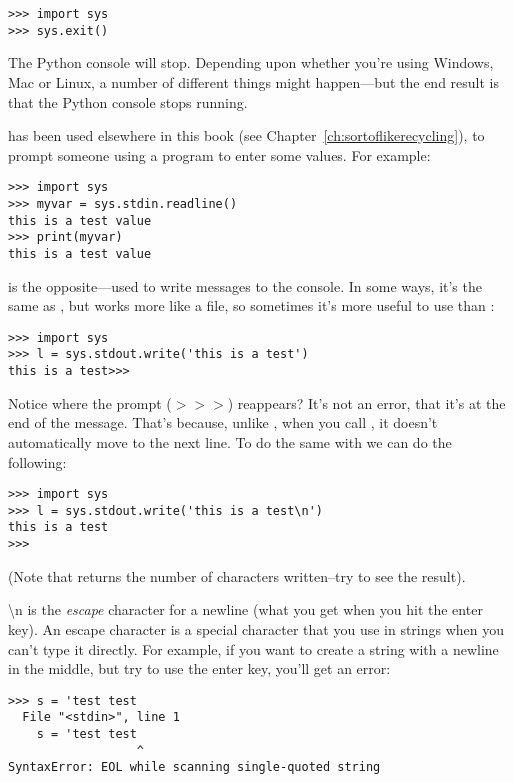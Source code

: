\begin{Verbatim}[frame=single]
>>> import sys
>>> sys.exit()
\end{Verbatim}

The Python console will stop. Depending upon whether you're using Windows, Mac or Linux, a number of different things might happen---but the end result is that the Python console stops running.

 has been used elsewhere in this book (see Chapter~\ref{ch:sortoflikerecycling}), to prompt someone using a program to enter some values. For example:

\begin{Verbatim}[frame=single]
>>> import sys
>>> myvar = sys.stdin.readline()
this is a test value
>>> print(myvar)
this is a test value
\end{Verbatim}

 is the opposite---used to write messages to the console. In some ways, it's the same as , but works more like a file, so sometimes it's more useful to use  than :

\begin{Verbatim}[frame=single]
>>> import sys
>>> l = sys.stdout.write('this is a test')
this is a test>>>
\end{Verbatim}

Notice where the prompt ($>>>$) reappears?  It's not an error, that it's at the end of the message.  That's because, unlike , when you call , it doesn't automatically move to the next line. To do the same with  we can do the following:

\begin{Verbatim}[frame=single]
>>> import sys
>>> l = sys.stdout.write('this is a test\n')
this is a test
>>>
\end{Verbatim}

\noindent
(Note that  returns the number of characters written--try  to see the result).

\noindent
{\textbackslash}n is the \emph{escape} character for a newline (what you get when you hit the enter key).  An escape character is a special character that you use in strings when you can't type it directly. For example, if you want to create a string with a newline in the middle, but try to use the enter key, you'll get an error:

\begin{Verbatim}[frame=single]
>>> s = 'test test
  File "<stdin>", line 1
    s = 'test test
                  ^
SyntaxError: EOL while scanning single-quoted string
\end{Verbatim}

